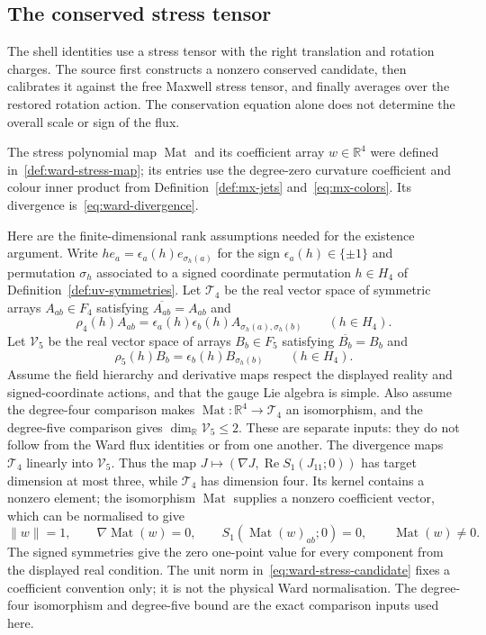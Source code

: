 \subsection{The conserved stress tensor}
\label{subsec:ward-stress}

The shell identities use a stress tensor with the right translation and rotation charges. The source first constructs a nonzero conserved candidate, then calibrates it against the free Maxwell stress tensor, and finally averages over the restored rotation action. The conservation equation alone does not determine the overall scale or sign of the flux.

The stress polynomial map $\operatorname{Mat}$ and its coefficient array $w\in\mathbb R^4$ were defined in~\eqref{def:ward-stress-map}; its entries use the degree-zero curvature coefficient and colour inner product from Definition~\ref{def:mx-jets} and~\eqref{eq:mx-colors}. Its divergence is~\eqref{eq:ward-divergence}.

Here are the finite-dimensional rank assumptions needed for the existence argument. Write $h e_a=\epsilon_a(h)e_{\sigma_h(a)}$ for the sign $\epsilon_a(h)\in\{\pm1\}$ and permutation $\sigma_h$ associated to a signed coordinate permutation $h\in H_4$ of Definition~\ref{def:uv-symmetries}. Let $\mathcal T_4$ be the real vector space of symmetric arrays $A_{ab}\in F_4$ satisfying $\overline{A_{ab}}=A_{ab}$ and
\[
 \rho_4(h)A_{ab}=\epsilon_a(h)\epsilon_b(h)A_{\sigma_h(a),\sigma_h(b)}\qquad(h\in H_4).
\]
Let $\mathcal V_5$ be the real vector space of arrays $B_b\in F_5$ satisfying $\overline{B_b}=B_b$ and
\[
 \rho_5(h)B_b=\epsilon_b(h)B_{\sigma_h(b)}\qquad(h\in H_4).
\]
Assume the field hierarchy and derivative maps respect the displayed reality and signed-coordinate actions, and that the gauge Lie algebra is simple. Also assume the degree-four comparison makes $\operatorname{Mat}:\mathbb R^4\to\mathcal T_4$ an isomorphism, and the degree-five comparison gives $\dim_{\mathbb R}\mathcal V_5\le2$. These are separate inputs: they do not follow from the Ward flux identities or from one another. The divergence maps $\mathcal T_4$ linearly into $\mathcal V_5$. Thus the map $J\mapsto(\nabla J,\operatorname{Re}S_1(J_{11};0))$ has target dimension at most three, while $\mathcal T_4$ has dimension four. Its kernel contains a nonzero element; the isomorphism $\operatorname{Mat}$ supplies a nonzero coefficient vector, which can be normalised to give
\begin{equation}\label{eq:ward-stress-candidate}
 \|w\|=1,\qquad \nabla\operatorname{Mat}(w)=0,\qquad
 S_1(\operatorname{Mat}(w)_{ab};0)=0,\qquad \operatorname{Mat}(w)\ne0.
\end{equation}
The signed symmetries give the zero one-point value for every component from the displayed real condition. The unit norm in~\eqref{eq:ward-stress-candidate} fixes a coefficient convention only; it is not the physical Ward normalisation. The degree-four isomorphism and degree-five bound are the exact comparison inputs used here.


